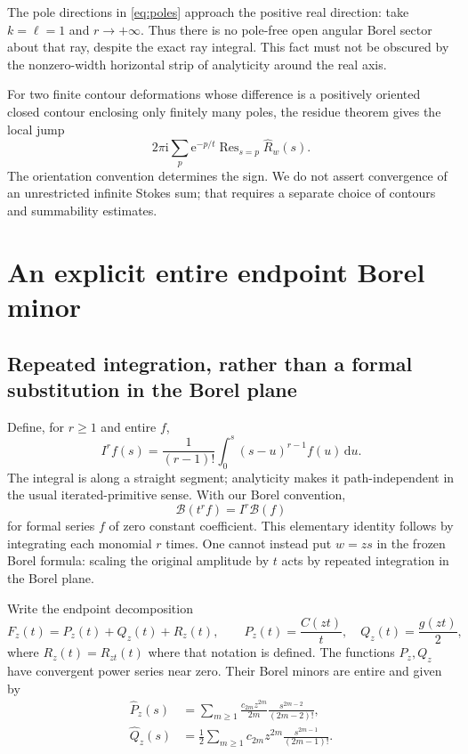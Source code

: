 \documentclass[11pt,a4paper]{article}
\numberwithin{equation}{section}
\theoremstyle{definition}
\theoremstyle{remark}
\newcommand{\ii}{\mathrm i}
\newcommand{\e}{\mathrm e}
\newcommand{\dd}{\,\mathrm d}
\newcommand{\Borel}{\mathcal B}
\DeclareMathOperator{\Res}{Res}
\begin{document}
The pole directions in \eqref{eq:poles} approach the positive real direction: take $k=\ell=1$ and $r\to+\infty$. Thus there is no pole-free open angular Borel sector about that ray, despite the exact ray integral. This fact must not be obscured by the nonzero-width horizontal strip of analyticity around the real axis.

For two finite contour deformations whose difference is a positively oriented closed contour enclosing only finitely many poles, the residue theorem gives the local jump
\begin{equation}
 2\pi\ii\sum_p\e^{-p/t}\Res_{s=p}\widehat R_w(s).
 \label{eq:localStokes}
\end{equation}
The orientation convention determines the sign. We do not assert convergence of an unrestricted infinite Stokes sum; that requires a separate choice of contours and summability estimates.

\section{An explicit entire endpoint Borel minor}
\label{sec:endpointborel}

\subsection{Repeated integration, rather than a formal substitution in the Borel plane}
Define, for $r\ge1$ and entire $f$,
\begin{equation}
 I^rf(s)=\frac1{(r-1)!}\int_0^s(s-u)^{r-1}f(u)\dd u.
 \label{eq:I}
\end{equation}
The integral is along a straight segment; analyticity makes it path-independent in the usual iterated-primitive sense. With our Borel convention,
\begin{equation}
 \Borel(t^rf)=I^r\Borel(f)
 \label{eq:Bmult}
\end{equation}
for formal series $f$ of zero constant coefficient. This elementary identity follows by integrating each monomial $r$ times. One cannot instead put $w=zs$ in the frozen Borel formula: scaling the original amplitude by $t$ acts by repeated integration in the Borel plane.

Write the endpoint decomposition
\begin{equation}
 F_z(t)=P_z(t)+Q_z(t)+R_z(t),\qquad
 P_z(t)=\frac{C(zt)}t,\quad Q_z(t)=\frac{g(zt)}2,
 \label{eq:enddecomp}
\end{equation}
where $R_z(t)=R_{zt}(t)$ where that notation is defined. The functions $P_z,Q_z$ have convergent power series near zero. Their Borel minors are entire and given by
\begin{align}
 \widehat P_z(s)&=\sum_{m\ge1}\frac{c_{2m}z^{2m}}{2m}
                    \frac{s^{2m-2}}{(2m-2)!},\label{eq:Pminor}\\
 \widehat Q_z(s)&=\frac12\sum_{m\ge1}c_{2m}z^{2m}
                    \frac{s^{2m-1}}{(2m-1)!}.
 \label{eq:Qminor}
\end{align}
\end{document}
